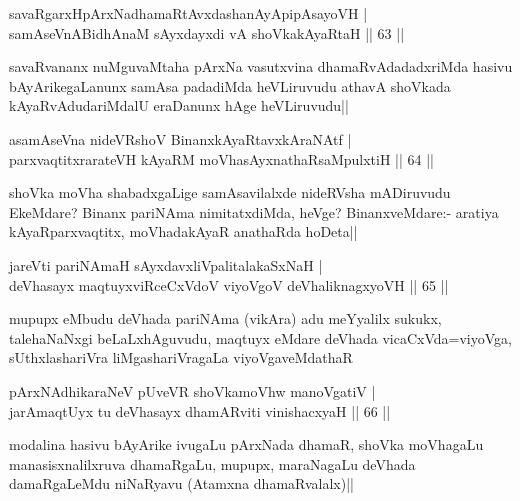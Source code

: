 
\begin{shl}
savaRgarxHpArxNadhamaRtAvxdashanAyApipAsayoVH |\\
samAseVnABidhAnaM sAyxdayxdi vA shoVkakAyaRtaH \hfill || 63 ||
\end{shl}

\begin{artha}
savaRvananx nuMguvaMtaha pArxNa vasutxvina dhamaRvAdadadxriMda hasivu bAyArikegaLanunx samAsa padadiMda heVLiruvudu athavA shoVkada kAyaRvAdudariMdalU eraDanunx hAge heVLiruvudu||
\end{artha}

\begin{shl}
asamAseVna nideVRshoV BinanxkAyaRtavxkAraNAtf |\\
parxvaqtitxrarateVH kAyaRM moVhasAyxnathaRsaMpulxtiH \hfill || 64 ||
\end{shl}

\begin{artha}
shoVka moVha shabadxgaLige samAsavilalxde nideRVsha mADiruvudu EkeMdare? Binanx pariNAma nimitatxdiMda, heVge? BinanxveMdare:- aratiya kAyaRparxvaqtitx, moVhadakAyaR anathaRda hoDeta||
\end{artha}

\begin{shl}
jareVti pariNAmaH sAyxdavxliVpalitalakaSxNaH |\\
deVhasayx maqtuyxviRceCxVdoV viyoVgoV deVhaliknagxyoVH \hfill || 65 ||
\end{shl}

\begin{artha}
mupupx eMbudu deVhada pariNAma (vikAra) adu meYyalilx sukukx, talehaNaNxgi beLaLxhAguvudu, maqtuyx eMdare deVhada vicaCxVda=viyoVga, sUthxlashariVra liMgashariVragaLa viyoVgaveMdathaR
\end{artha}


\begin{shl}
pArxNAdhikaraNeV pUveVR shoVkamoVhw manoVgatiV  |\\
jarAmaqtUyx tu deVhasayx dhamARviti vinishacxyaH \hfill || 66 ||
\end{shl}

\begin{artha}
modalina hasivu bAyArike ivugaLu pArxNada dhamaR, shoVka moVhagaLu manasisxnalilxruva dhamaRgaLu, mupupx, maraNagaLu deVhada damaRgaLeMdu niNaRyavu (Atamxna dhamaRvalalx)||
\end{artha}

